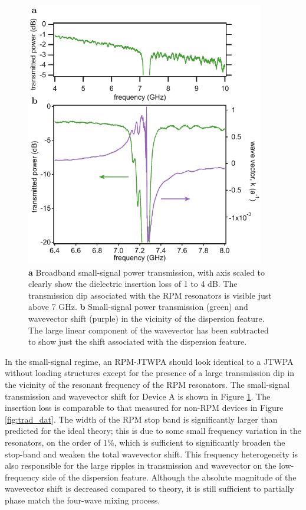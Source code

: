 \begin{figure}
\begin{center}
\includegraphics[width=4.1in]{twpa_exp/twpa_trans}
\end{center}
\caption[Transmitted power and wavevector shift]{\textbf{a} Broadband small-signal power transmission, with axis scaled to clearly show the dielectric insertion loss of 1 to 4 dB.  The transmission dip associated with the RPM resonators is visible just above 7 GHz. \textbf{b} Small-signal power transmission (green) and wavevector shift (purple) in the vicinity of the dispersion feature.  The large linear component of the wavevector has been subtracted to show just the shift associated with the dispersion feature.}
\label{fig:twpa_trans}
\end{figure}

In the small-signal regime, an RPM-JTWPA should look identical to a JTWPA without loading structures except for the presence of a large transmission dip in the vicinity of the resonant frequency of the RPM resonators.  The small-signal transmission and wavevector shift for Device A is shown in Figure \ref{fig:twpa_trans}.  The insertion loss is comparable to that measured for non-RPM devices in Figure \ref{fig:trad_dat}.  The width of the RPM stop band is significantly larger than predicted for the ideal theory; this is due to some small frequency variation in the resonators, on the order of 1\%, which is sufficient to significantly broaden the stop-band and weaken the total wavevector shift.  This frequency heterogeneity is also responsible for the large ripples in transmission and wavevector on the low-frequency side of the dispersion feature.  Although the absolute magnitude of the wavevector shift is decreased compared to theory, it is still sufficient to partially phase match the four-wave mixing process.

